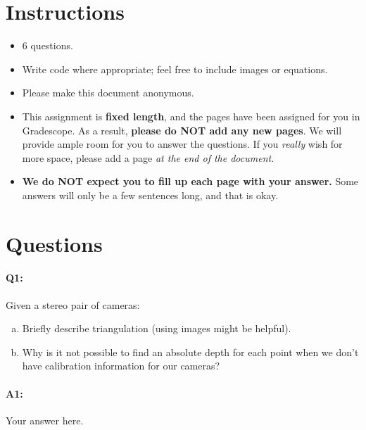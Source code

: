 \maketitle
\vspace{-2cm}
\thispagestyle{fancy}

\section*{Instructions}
\begin{itemize}
    \item 6 questions.
    \item Write code where appropriate; feel free to include images or equations.
    \item Please make this document anonymous.
    \item This assignment is \textbf{fixed length}, and the pages have been assigned for you in Gradescope. As a result, \textbf{please do NOT add any new pages}. We will provide ample room for you to answer the questions. If you \emph{really} wish for more space, please add a page \emph{at the end of the document}.
    \item \textbf{We do NOT expect you to fill up each page with your answer.} Some answers will only be a few sentences long, and that is okay.
\end{itemize}

\section*{Questions}


\paragraph{Q1:} Given a stereo pair of cameras:
\begin{enumerate} [(a)]
    \item Briefly describe triangulation (using images might be helpful).
    \item Why is it not possible to find an absolute depth for each point when we don't have calibration information for our cameras?
\end{enumerate}

\paragraph{A1:} Your answer here.

